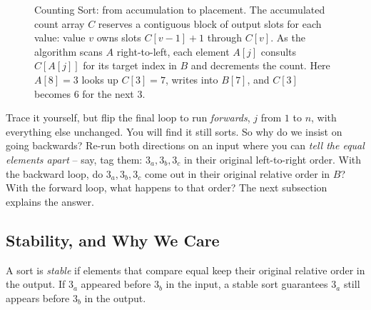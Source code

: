 \begin{figure}[H]
\caption{Counting Sort: from accumulation to placement. The accumulated count
array $C$ reserves a contiguous block of output slots for each value: value $v$
owns slots $C[v-1]+1$ through $C[v]$. As the algorithm scans $A$ right-to-left,
each element $A[j]$ consults $C[A[j]]$ for its target index in $B$ and
decrements the count. Here $A[8] = 3$ looks up $C[3] = 7$, writes into $B[7]$,
and $C[3]$ becomes $6$ for the next $3$.}
\label{ch08:counting-place}
\end{figure}

\begin{labbox}
Trace it yourself, but flip the final loop to run \emph{forwards}, $j$ from $1$
to $n$, with everything else unchanged. You will find it still sorts. So why do
we insist on going backwards? Re-run both directions on an input where you can
\emph{tell the equal elements apart} -- say, tag them: $3_a, 3_b, 3_c$ in their
original left-to-right order. With the backward loop, do $3_a, 3_b, 3_c$ come
out in their original relative order in $B$? With the forward loop, what happens
to that order? The next subsection explains the answer.
\end{labbox}

\subsection{Stability, and Why We Care}

\begin{definition}
A sort is \emph{stable} if elements that compare equal keep their original
relative order in the output. If $3_a$ appeared before $3_b$ in the input, a
stable sort guarantees $3_a$ still appears before $3_b$ in the output.
\end{definition}

